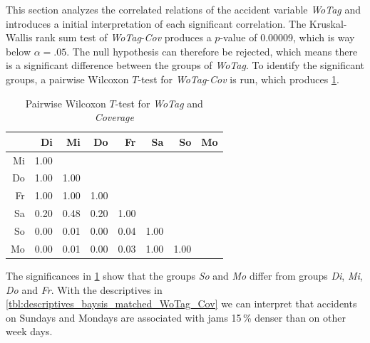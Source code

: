 This section analyzes the correlated relations of the accident variable \textit{WoTag} and introduces a initial interpretation of each significant correlation. The Kruskal-Wallis rank sum test of \textit{WoTag}-\textit{Cov} produces a $p$-value of 0.00009, which is way below $\alpha=.05$. The null hypothesis can therefore be rejected, which means there is a significant difference between the groups of \textit{WoTag}. To identify the significant groups, a pairwise Wilcoxon $T$-test for \textit{WoTag}-\textit{Cov} is run, which produces \cref{tbl:wilcoxon_baysis_matched_WoTag_Cov}. 
\begin{table}[ht!]
	\tiny
	\centering
    \begin{tabular}{rrrrrrrr}
        \toprule
        & Di & Mi & Do & Fr & Sa & So & Mo \\ 
        \midrule
        Mi & 1.00 &  &  &  &  &  &  \\ 
        Do & 1.00 & 1.00 &  &  &  &  &  \\ 
        Fr & 1.00 & 1.00 & 1.00 &  &  &  &  \\ 
        Sa & 0.20 & 0.48 & 0.20 & 1.00 &  &  &  \\ 
        So & 0.00 & 0.01 & 0.00 & 0.04 & 1.00 &  &  \\ 
        Mo & 0.00 & 0.01 & 0.00 & 0.03 & 1.00 & 1.00 &  \\ 
        \bottomrule
      \end{tabular}
	\caption{Pairwise Wilcoxon $T$-test for \textit{WoTag} and \textit{Coverage}}
	\label{tbl:wilcoxon_baysis_matched_WoTag_Cov}
\end{table}
The significances in \cref{tbl:wilcoxon_baysis_matched_WoTag_Cov} show that the groups \textit{So} and \textit{Mo} differ from groups \textit{Di}, \textit{Mi}, \textit{Do} and \textit{Fr}. With the descriptives in \cref{tbl:descriptives_baysis_matched_WoTag_Cov} we can interpret that accidents on Sundays and Mondays are associated with jams 15\,\% denser than on other week days.
